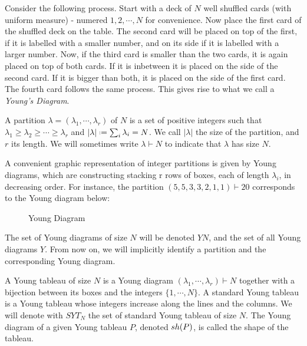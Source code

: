 Consider the following process. Start with a deck of $N$ well shuffled cards (with uniform measure) - numered $1, 2, \cdots, N$ for convenience. Now place the first card of the shuffled deck on the table. The second card will be placed on top of the first, if it is labelled with a smaller number, and on its side if it is labelled with a larger number. Now, if the third card is smaller than the two cards, it is again placed on top of both cards. If it is inbetween it is placed on the side of the second card. If it is bigger than both, it is placed on the side of the first card. The fourth card follows the same process. This gives rise to what we call a \textit{Young's Diagram}.

\begin{definition}
	A partition $\lambda = (\lambda_1, \cdots, \lambda_r)$ of $N$ is a set of positive integers such that $\lambda_1 \geq \lambda_2 \geq  \cdots \geq \lambda_r$ and $|\lambda| \deff \sum_i \lambda_i = N$. We call $|\lambda|$ the size of the partition, and $r$ its length. We will sometimes write $\lambda \vdash N$ to indicate that $\lambda$ has size $N$. 
\end{definition}

A convenient graphic representation of integer partitions is given by Young diagrams, which are constructing stacking r rows of boxes, each of length $\lambda_i$, in decreasing order. For instance, the partition $(5, 5, 3, 3, 2, 1, 1) \vdash 20$ corresponds to the Young diagram below: 
\begin{figure}[h!]
	\centering
	\caption{Young Diagram}
\end{figure}
The set of Young diagrams of size $N$ will be denoted $YN$, and the set of all Young diagrams $Y$. From now on, we will implicitly identify a partition and the corresponding Young diagram. 

\begin{definition}
	A Young tableau of size $N$ is a Young diagram $(\lambda_1, \cdots, \lambda_r) \vdash N$ together with a bijection between its boxes and the integers $\{1, \cdots , N\}$. A standard Young tableau is a Young tableau whose integers increase along the lines and the columns. We will denote with $SYT_N$ the set of standard Young tableau of size $N$. The Young diagram of a given Young tableau $P$, denoted $sh(P)$, is called the shape of the tableau. 
\end{definition}


